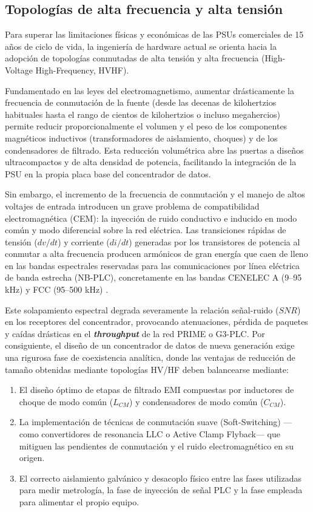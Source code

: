 \subsection{Topologías de alta frecuencia y alta tensión}
\label{subsec:topologias_alta_frecuencia_tension}

Para superar las limitaciones físicas y económicas de las PSUs comerciales de 15 años de ciclo de vida, la ingeniería de hardware actual se orienta hacia la adopción de topologías conmutadas de alta tensión y alta frecuencia (High-Voltage High-Frequency, HVHF). 
 
Fundamentado en las leyes del electromagnetismo, aumentar drásticamente la frecuencia de conmutación de la fuente (desde las decenas de kilohertzios habituales hasta el rango de cientos de kilohertzios o incluso megahercios) permite reducir proporcionalmente el volumen y el peso de los componentes magnéticos inductivos (transformadores de aislamiento, choques) y de los condensadores de filtrado. Esta reducción volumétrica abre las puertas a diseños ultracompactos y de alta densidad de potencia, facilitando la integración de la PSU en la propia placa base del concentrador de datos.

Sin embargo, el incremento de la frecuencia de conmutación y el manejo de altos voltajes de entrada introducen un grave problema de compatibilidad electromagnética (CEM): la inyección de ruido conductivo e inducido en modo común y modo diferencial sobre la red eléctrica. Las transiciones rápidas de tensión ($dv/dt$) y corriente ($di/dt$) generadas por los transistores de potencia al conmutar a alta frecuencia producen armónicos de gran energía que caen de lleno en las bandas espectrales reservadas para las comunicaciones por línea eléctrica de banda estrecha (NB-PLC), concretamente en las bandas CENELEC A (9--95 kHz) y FCC (95--500 kHz) \cite{SHARMA2017704}. 

Este solapamiento espectral degrada severamente la relación señal-ruido ($SNR$) en los receptores del concentrador, provocando atenuaciones, pérdida de paquetes y caídas drásticas en el \textit{\textbf{throughput}} de la red PRIME o G3-PLC. Por consiguiente, el diseño de un concentrador de datos de nueva generación exige una rigurosa fase de coexistencia analítica, donde las ventajas de reducción de tamaño obtenidas mediante topologías HV/HF deben balancearse mediante:
\begin{enumerate}
    \item El diseño óptimo de etapas de filtrado EMI compuestas por inductores de choque de modo común ($L_{CM}$) y condensadores de modo común ($C_{CM}$).
    \item La implementación de técnicas de conmutación suave (Soft-Switching) —como convertidores de resonancia LLC o Active Clamp Flyback— que mitiguen las pendientes de conmutación y el ruido electromagnético en su origen.
    \item El correcto aislamiento galvánico y desacoplo físico entre las fases utilizadas para medir metrología, la fase de inyección de señal PLC y la fase empleada para alimentar el propio equipo.
\end{enumerate}